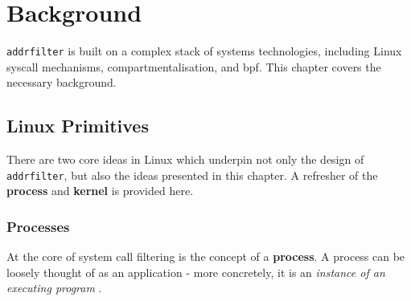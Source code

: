 \section{Background} \label{sec:background}



\texttt{addrfilter} is built on a complex stack of systems technologies,
including Linux syscall mechanisms, compartmentalisation, and \ac{bpf}. This
chapter covers the necessary background.

\subsection{Linux Primitives}

There are two core ideas in Linux which underpin not only the design of
\texttt{addrfilter}, but also the ideas presented in this chapter. A refresher
of the \textbf{process} and \textbf{kernel} is provided here.

\subsubsection{Processes}

At the core of system call filtering is the concept of a \textbf{process}. A
process can be loosely thought of as an application - more concretely, it is an
\textit{instance of an executing program} \cite{LINUX_PROGRAMMING_INTERFACE}.







